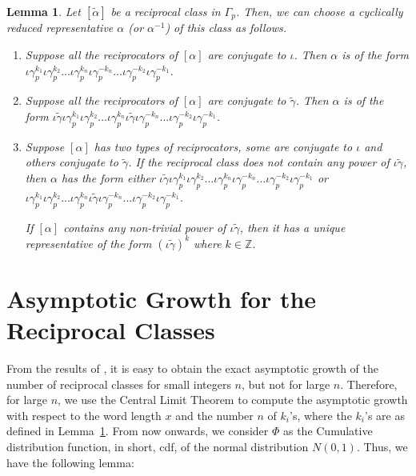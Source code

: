 \documentclass[11pt]{amsart}
\numberwithin{equation}{section}
\newtheorem{lemma}[theorem]{Lemma}
\newcommand{\gt}{\tilde{\gamma}}
\newcommand{\n}{\newline}
\newcommand{\z}{\mathbb{Z}}
\newcommand{\g}{\gamma_{p}}
\newcommand{\io}{\iota }
\newcommand{\lemref}[1]{Lemma~\ref{#1}}
\numberwithin{equation}{section}
\begin{document}
\begin{lemma}\label{lem}\cite[Lemma 3.2]{DG2} Let $[{\tilde{\alpha}}]$ be a reciprocal class in $\Gamma_p$.  Then, we can choose a cyclically reduced representative $\alpha$ (or $\alpha^{-1}$) of this class as follows.  
		
		\begin{enumerate}
			\item Suppose all the reciprocators of $[\alpha]$ are conjugate to $\io$. Then  $\alpha$ is of the form  \\$ \io\g^{k_{1}}\io \g^{k_{2}}\dots \io \g^{k_{n}}\io \g^{-k_{n}}\dots\io \g^{-k_{2}}\io \g^{-k_{1}}  $.
			\item Suppose all the reciprocators of $[\alpha]$ are  conjugate to $ \gt $. Then $\alpha$ is of the form  \n  $ \io \gt\io \g^{k_{1}}\io \g^{k_{2}}\dots \io \g^{k_{n}}\io \gt\io \g^{-k_{n}}\dots\io \g^{-k_{2}}\io \g^{-k_{1}} $.
			\item Suppose  $[\alpha]$ has two types of reciprocators, some are conjugate to  $ \io $ and others conjugate to $ \gt $. 
			If the reciprocal class does not contain any power of $\io \gt$,   then $\alpha$ has the form  either \n
			$ \io\gt\io  \g^{k_{1}}\io \g^{k_{2}}\dots \io \g^{k_{n}}\io \g^{-k_{n}}\dots\io \g^{-k_{2}}\io \g^{-k_{1}} $ or $\io  \g^{k_{1}}\io \g^{k_{2}}\dots \io \g^{k_{n}}\io\gt\io \g^{-k_{n}}\dots\io \g^{-k_{2}}\io \g^{-k_{1}}$.
			
			
			If $[\alpha]$ contains any non-trivial power of $\io \gt  $, then it has a unique representative of the form $ (\io\gt )^{k}$ where $ k\in \z$. 
	\end{enumerate}\end{lemma}

		
		
		
		
		\section{Asymptotic Growth for the Reciprocal Classes}\label{4}
		From the results of \cite{DG2}, it is easy to obtain the exact asymptotic growth of the number of reciprocal classes for small integers \( n \), but not for large \( n \). Therefore, for large \( n \), we use the Central Limit Theorem to compute the asymptotic growth with respect to the word length \( x \) and the number \( n \) of \( k_i \)'s, where the \( k_i \)'s are as defined in \lemref{lem}.
 From now onwards, we consider $\Phi$ as the Cumulative distribution function, in short, cdf, of the normal distribution $N(0,1)$. Thus, we have the following lemma:
		 
\end{document}
